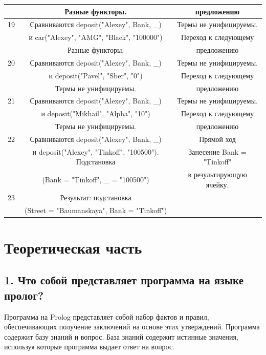 \documentclass[12pt]{report}
\begin{document}
\begin{table}[H]
\begin{center}
\begin{tabular}{|c c c |}
			   & Разные функторы. & предложению \\
			\hline
			19 & Сравниваются deposit("Alexey"{}, Bank, \_) & Термы не унифицируемы.\\
			   & и car("Alexey"{}, "AMG"{}, "Black"{}, "100000"{}) & Переход к следующему  \\
			   & Разные функторы. & предложению \\
			\hline
		    20 & Сравниваются deposit("Alexey"{}, Bank, \_) & Термы не унифицируемы.\\
			   & и deposit("Pavel"{}, "Sber"{}, "0"{}) & Переход к следующему  \\
			   & Термы не унифицируемы. & предложению \\
			\hline
			21 & Сравниваются deposit("Alexey"{}, Bank, \_) & Термы не унифицируемы.\\
			   & и deposit("Mikhail"{}, "Alpha"{}, "10"{}) & Переход к следующему  \\
			   & Термы не унифицируемы. & предложению \\
			\hline
			22 & Сравниваются deposit("Alexey"{}, Bank, \_) & Прямой ход\\
			   & и deposit("Alexey"{}, "Tinkoff"{}, "100500"{}). Подстановка & Занесение Bank = "Tinkoff"{} \\
			   & (Bank = "Tinkoff"{}, \_ = "100500"{}) & в результирующую ячейку. \\
			\hline
			23 & Результат: подстановка & \\
			& (Street = "Baumanskaya"{}, Bank = "Tinkoff"{})&\\
			\hline
		\end{tabular}
	\end{center}
\end{table}


\chapter*{Теоретическая часть}

\section*{1. Что собой представляет программа на языке пролог?}

Программа на Prolog представляет собой набор фактов и правил, обеспечивающих получение заключений на основе этих утверждений. Программа содержит базу знаний и вопрос. База знаний содержит истинные значения, используя которые программа выдает ответ на вопрос. 
\end{document}
